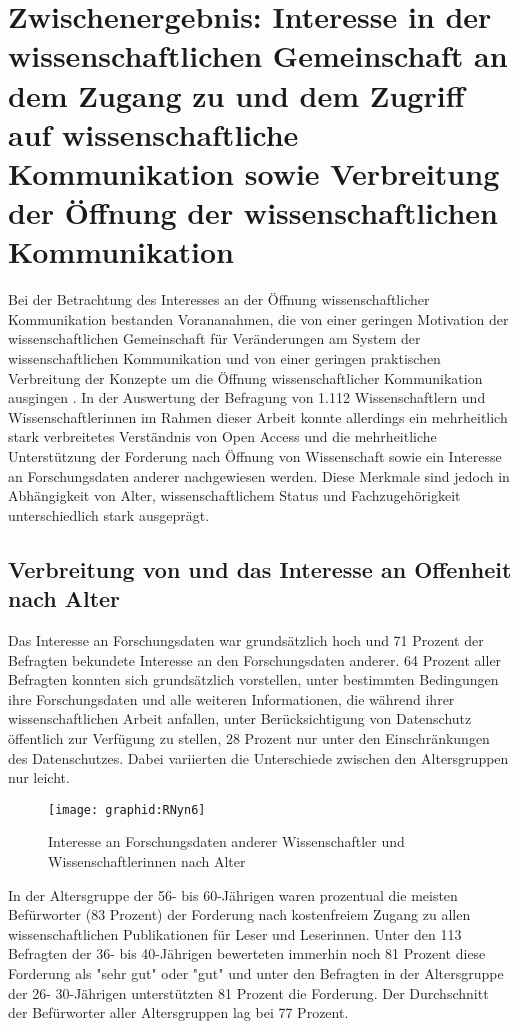 \section{Zwischenergebnis: Interesse in der wissenschaftlichen Gemeinschaft an dem Zugang zu und dem Zugriff auf wissenschaftliche Kommunikation sowie Verbreitung der Öffnung der wissenschaftlichen Kommunikation}

Bei der Betrachtung des Interesses an der Öffnung wissenschaftlicher Kommunikation bestanden Vorananahmen, die von einer geringen Motivation der wissenschaftlichen Gemeinschaft für Veränderungen am System der wissenschaftlichen Kommunikation \cite{Hagner_2015} und von einer geringen praktischen Verbreitung der Konzepte um die Öffnung wissenschaftlicher Kommunikation ausgingen \cite{Scheliga_2014}. In der Auswertung der Befragung von 1.112 Wissenschaftlern und Wissenschaftlerinnen im Rahmen dieser Arbeit konnte allerdings ein mehrheitlich stark verbreitetes Verständnis von Open Access und die mehrheitliche Unterstützung der Forderung nach Öffnung von Wissenschaft sowie ein Interesse an Forschungsdaten anderer nachgewiesen werden. Diese Merkmale sind jedoch in Abhängigkeit von Alter, wissenschaftlichem Status und Fachzugehörigkeit unterschiedlich stark ausgeprägt.

\subsection{Verbreitung von und das Interesse an Offenheit nach Alter}

Das Interesse an Forschungsdaten war grundsätzlich hoch und 71 Prozent der Befragten bekundete Interesse an den Forschungsdaten anderer. 64 Prozent aller Befragten konnten sich grundsätzlich vorstellen, unter bestimmten Bedingungen ihre Forschungsdaten und alle weiteren Informationen, die während ihrer wissenschaftlichen Arbeit anfallen, unter Berücksichtigung von Datenschutz öffentlich zur Verfügung zu stellen, 28 Prozent nur unter den Einschränkungen des Datenschutzes. Dabei variierten die Unterschiede zwischen den Altersgruppen nur leicht.

\begin{figure}[h!]
\texttt{[image: graphid:RNyn6]}
\caption{Interesse an Forschungsdaten anderer Wissenschaftler und Wissenschaftlerinnen nach Alter}
\end{figure}

In der Altersgruppe der 56- bis 60-Jährigen waren prozentual die meisten Befürworter (83 Prozent) der Forderung nach kostenfreiem Zugang zu allen wissenschaftlichen Publikationen für Leser und Leserinnen. Unter den 113 Befragten der 36- bis 40-Jährigen bewerteten immerhin noch 81 Prozent diese Forderung als "sehr gut" oder "gut" und unter den Befragten in der Altersgruppe der 26- 30-Jährigen unterstützten 81 Prozent die Forderung. Der Durchschnitt der Befürworter aller Altersgruppen lag bei 77 Prozent.

